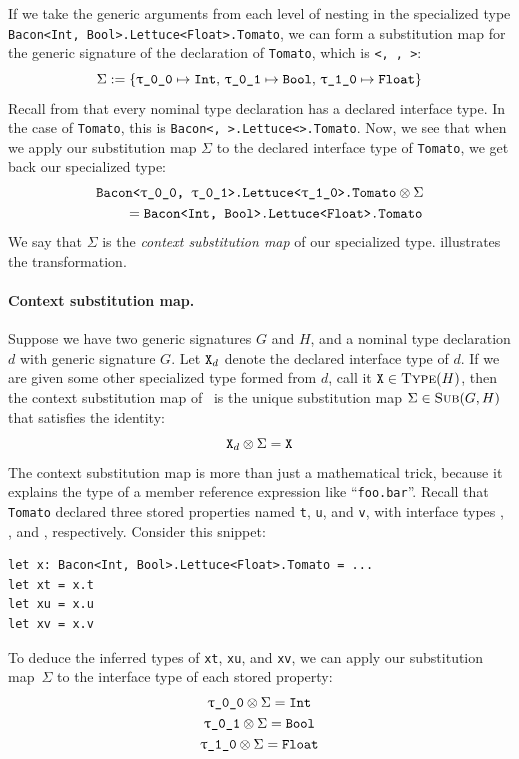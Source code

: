 \documentclass[../generics]{subfiles}
\begin{document}
If we take the generic arguments from each level of nesting in the specialized type \texttt{Bacon<Int, Bool>.Lettuce<Float>.Tomato}, we can form a substitution map for the generic signature of the declaration of \texttt{Tomato}, which is \texttt{<\rT, \rU, >}:
\[
\Sigma := \SubstMap{ \SubstType{\rT}{Int},\, \SubstType{\rU}{Bool},\, \SubstType{\ttgp{1}{0}}{Float} }
\]
Recall from  that every nominal type declaration has a declared interface type. In the case of \texttt{Tomato}, this is \texttt{Bacon<\rT, \rU>.Lettuce<>.Tomato}. Now, we see that when we apply our substitution map $\Sigma$ to the declared interface type of \texttt{Tomato}, we get back our specialized type:
\begin{gather*}
\texttt{Bacon<\rT, \rU>.Lettuce<\ttgp{1}{0}>.Tomato} \otimes \Sigma \\
{} \qquad = \texttt{Bacon<Int, Bool>.Lettuce<Float>.Tomato}
\end{gather*}
We say that $\Sigma$ is the \emph{context substitution map} of our specialized type.  illustrates the transformation.

\paragraph{Context substitution map.}
Suppose we have two generic signatures $G$ and $H$, and a nominal type declaration $d$ with generic signature $G$. Let $\texttt{X}_d$ denote the declared interface type of $d$. If we are given some other specialized type formed from $d$, call it $\texttt{X}\in\textsc{Type}({H})$, then the context substitution map of \tX\ is the unique substitution map $\Sigma\in\textsc{Sub}({G, H})$ that satisfies the identity:
\[ \texttt{X}_d \otimes \Sigma = \texttt{X} \]
The context substitution map is more than just a mathematical trick, because it explains the type of a member reference expression like ``\texttt{foo.bar}''. Recall that \texttt{Tomato} declared three stored properties named \texttt{t}, \texttt{u}, and \texttt{v}, with interface types \rT, \rU, and , respectively. Consider this snippet:
\begin{Verbatim}
let x: Bacon<Int, Bool>.Lettuce<Float>.Tomato = ...
let xt = x.t
let xu = x.u
let xv = x.v
\end{Verbatim}
To deduce the inferred types of \texttt{xt}, \texttt{xu}, and \texttt{xv}, we can apply our substitution map~$\Sigma$ to the interface type of each stored property:
\begin{gather*}
\rT \otimes \Sigma = \texttt{Int}\\
\rU \otimes \Sigma = \texttt{Bool}\\
\ttgp{1}{0} \otimes \Sigma = \texttt{Float}
\end{gather*}
\end{document}
